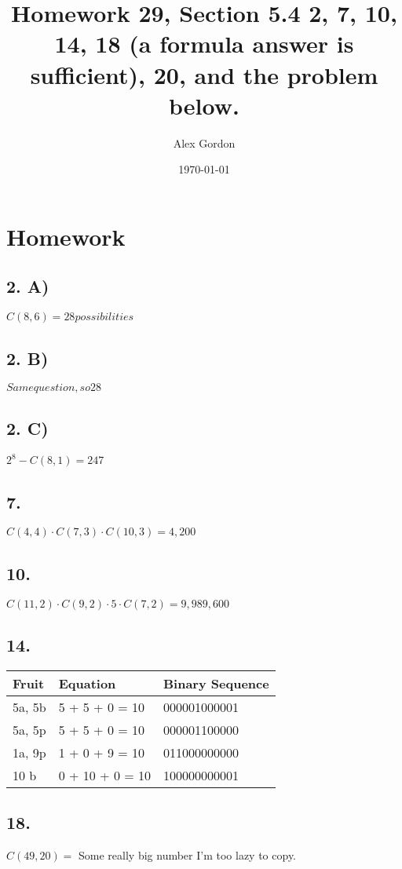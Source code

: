 \documentclass[12]{scrartcl}
\begin{document}
\title{Homework 29, Section 5.4 2, 7, 10, 14, 18 (a formula answer is sufficient), 20, and the problem below.}
\author{Alex Gordon}
\date{\today}
\maketitle
\section*{Homework}
\subsection*{2. A)}
$C(8,6) = 28 possibilities$
\subsection*{2. B)}
$Same question, so 28$
\subsection*{2. C)}
$2^8 - C(8,1) = 247$
\subsection*{7.}
$C(4,4) \cdot C(7,3) \cdot C(10,3) = 4,200$
\subsection*{10.}
$C(11,2) \cdot C(9,2) \cdot 5 \cdot C(7,2) = 9,989,600$
\subsection*{14.}
\begin{table}[H]
    \begin{tabular}{|l|l|l|}
    \hline
    Fruit  & Equation        & Binary Sequence \\ \hline
    5a, 5b & 5 + 5 + 0 = 10  & 000001000001    \\ \hline
    5a, 5p & 5 + 5 + 0 = 10  & 000001100000    \\ \hline
    1a, 9p & 1 + 0 + 9 = 10  & 011000000000    \\ \hline
    10 b   & 0 + 10 + 0 = 10 & 100000000001    \\ \hline
    \end{tabular}
\end{table}
\subsection*{18.}
$C(49,20) =$ Some really big number I'm too lazy to copy. 
\end{document}
